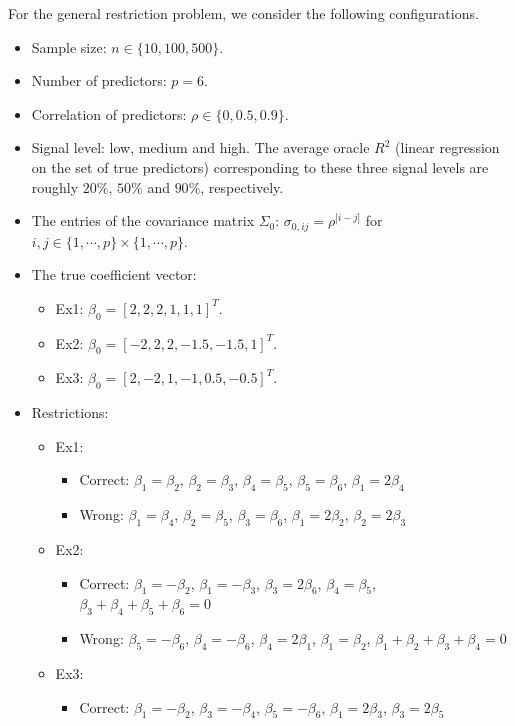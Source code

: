For the general restriction problem, we consider the following configurations.
\begin{itemize}
  \item Sample size: $n \in \{10, 100, 500\}$.
  \item Number of predictors: $p=6$.
  \item Correlation of predictors: $\rho \in \{0,0.5,0.9\}$.
  \item Signal level: low, medium and high. The average oracle $R^2$ (linear regression on the set of true predictors) corresponding to these three signal levels are roughly $20\%$, $50\%$ and $90\%$, respectively.
  \item The entries of the covariance matrix $\Sigma_0$: $\sigma_{0,ij}=\rho^{|i-j|}$ for $i,j\in\{1,\cdots,p\}\times\{1,\cdots,p\}$.
  \item The true coefficient vector:
  \begin{itemize}
    \item Ex1: $\beta_0 = [2,2,2,1,1,1]^T$. 
    \item Ex2: $\beta_0 = [-2,2,2,-1.5,-1.5,1]^T$.
    \item Ex3: $\beta_0 = [2,-2,1,-1,0.5,-0.5]^T$.
  \end{itemize}
  \item Restrictions:
  \begin{itemize}
    \item Ex1: 
    \begin{itemize}
      \item Correct: $\beta_1=\beta_2$, $\beta_2=\beta_3$, $\beta_4=\beta_5$, $\beta_5=\beta_6$, $\beta_1=2\beta_4$
      \item Wrong: $\beta_1=\beta_4$, $\beta_2=\beta_5$, $\beta_3=\beta_6$, $\beta_1=2\beta_2$, $\beta_2=2\beta_3$
    \end{itemize}
    \item Ex2:
    \begin{itemize}
      \item Correct: $\beta_1=-\beta_2$, $\beta_1=-\beta_3$, $\beta_3=2\beta_6$, $\beta_4=\beta_5$, $\beta_3+\beta_4+\beta_5+\beta_6=0$
      \item Wrong: $\beta_5=-\beta_6$, $\beta_4=-\beta_6$, $\beta_4=2\beta_1$, $\beta_1=\beta_2$, $\beta_1+\beta_2+\beta_3+\beta_4=0$
    \end{itemize}
    \item Ex3: 
    \begin{itemize}
      \item Correct: $\beta_1=-\beta_2$, $\beta_3=-\beta_4$, $\beta_5=-\beta_6$, $\beta_1=2\beta_3$, $\beta_3=2\beta_5$

\end{itemize}
\end{itemize}
\end{itemize}
